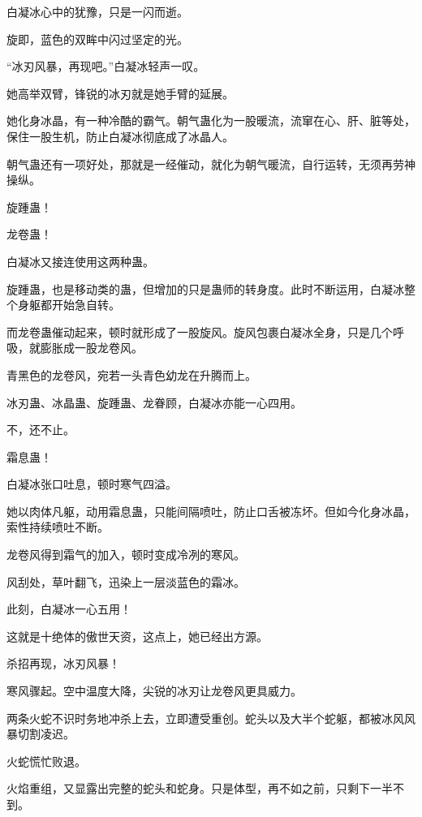
\begin{this_body}



白凝冰心中的犹豫，只是一闪而逝。

旋即，蓝色的双眸中闪过坚定的光。

“冰刃风暴，再现吧。”白凝冰轻声一叹。

她高举双臂，锋锐的冰刃就是她手臂的延展。

她化身冰晶，有一种冷酷的霸气。朝气蛊化为一股暖流，流窜在心、肝、脏等处，保住一股生机，防止白凝冰彻底成了冰晶人。

朝气蛊还有一项好处，那就是一经催动，就化为朝气暖流，自行运转，无须再劳神操纵。

旋踵蛊！

龙卷蛊！

白凝冰又接连使用这两种蛊。

旋踵蛊，也是移动类的蛊，但增加的只是蛊师的转身度。此时不断运用，白凝冰整个身躯都开始急自转。

而龙卷蛊催动起来，顿时就形成了一股旋风。旋风包裹白凝冰全身，只是几个呼吸，就膨胀成一股龙卷风。

青黑色的龙卷风，宛若一头青色幼龙在升腾而上。

冰刃蛊、冰晶蛊、旋踵蛊、龙眷顾，白凝冰亦能一心四用。

不，还不止。

霜息蛊！

白凝冰张口吐息，顿时寒气四溢。

她以肉体凡躯，动用霜息蛊，只能间隔喷吐，防止口舌被冻坏。但如今化身冰晶，索性持续喷吐不断。

龙卷风得到霜气的加入，顿时变成冷冽的寒风。

风刮处，草叶翻飞，迅染上一层淡蓝色的霜冰。

此刻，白凝冰一心五用！

这就是十绝体的傲世天资，这点上，她已经出方源。

杀招再现，冰刃风暴！

寒风骤起。空中温度大降，尖锐的冰刃让龙卷风更具威力。

两条火蛇不识时务地冲杀上去，立即遭受重创。蛇头以及大半个蛇躯，都被冰风风暴切割凌迟。

火蛇慌忙败退。

火焰重组，又显露出完整的蛇头和蛇身。只是体型，再不如之前，只剩下一半不到。


\end{this_body}
